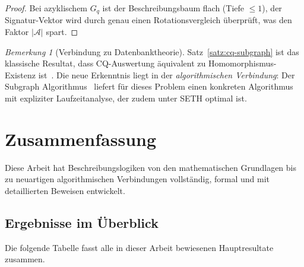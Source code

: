 ﻿\documentclass[a4paper,12pt]{article}
\theoremstyle{definition}
\theoremstyle{plain}
\theoremstyle{remark}
\newtheorem{bemerkung}{Bemerkung}[section]
\newcommand{\Abox}{\ensuremath{\mathcal{A}}}
\begin{document}
\begin{proof}
Bei azyklischem $G_q$ ist der Beschreibungsbaum flach
(Tiefe $\leq 1$), der Signatur-Vektor wird durch genau einen
Rotationsvergleich {\"u}berpr{\"u}ft, was den Faktor $|\Abox|$ spart.
\end{proof}

\begin{bemerkung}[Verbindung zu Datenbanktheorie]
Satz~\ref{satz:cq-subgraph} ist das klassische Resultat,
dass CQ-Auswertung {\"a}quivalent zu Homomorphismus-Existenz ist~\cite{Baader2007}.
Die neue Erkenntnis liegt in der \emph{algorithmischen Verbindung}:
Der Subgraph Algorithmus~\cite{Epp2026} liefert f{\"u}r dieses Problem
einen konkreten Algorithmus mit expliziter Laufzeitanalyse,
der zudem unter SETH optimal ist.
\end{bemerkung}

\section{Zusammenfassung}
\label{sec:zusammenfassung}

Diese Arbeit hat Beschreibungslogiken von den mathematischen
Grundlagen bis zu neuartigen algorithmischen Verbindungen
vollst{\"a}ndig, formal und mit detaillierten Beweisen entwickelt.

\subsection{Ergebnisse im {\"U}berblick}

Die folgende Tabelle fasst alle in dieser Arbeit bewiesenen
Hauptresultate zusammen.
\end{document}
